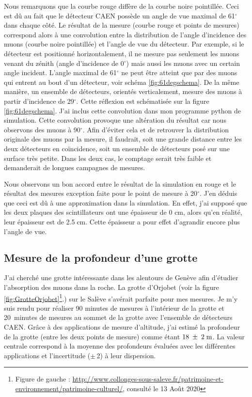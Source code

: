 \documentclass[a4paper, 12pt]{article}
\begin{document}
\begin{spacing}{1.5}
Nous remarquons que la courbe rouge diffère de la courbe noire pointillée. Ceci est dû au fait que le détecteur CAEN possède un angle de vue maximal de 61$^{\circ}$ dans chaque côté. Le résultat de la mesure (courbe rouge et points de mesures) correspond alors à une convolution entre la distribution de l'angle d'incidence des muons (courbe noire pointillée) et l'angle de vue du détecteur. Par exemple, si le détecteur est positionné horizontalement, il ne mesure pas seulement les muons venant du zénith (angle d'incidence de 0$^{\circ}$) mais aussi les muons avec un certain angle incident. L'angle maximal de 61$^{\circ}$ ne peut être atteint que par des muons qui entrent au bout d'un détecteur, voir schéma \ref{fig:61degschema}. De la même manière, un ensemble de détecteurs, orientés verticalement, mesure des muons à partir d'incidence de 29$^{\circ}$. Cette réflexion est schématisée sur la figure \ref{fig:61degschema}. J'ai inclus cette convolution dans mon programme python de simulation. Cette convolution provoque une altération du résultat car nous observons des muons à 90$^{\circ}$. Afin d'éviter cela et de retrouver la distribution originale des muons par la mesure, il faudrait, soit une grande distance entre les deux détecteurs en coïncidence, soit un ensemble de détecteurs posé sur une surface très petite. Dans les deux cas, le comptage serait très faible et demanderait de longues campagnes de mesures.

Nous observons un bon accord entre le résultat de la simulation en rouge et le résultat des mesures exception faite pour le point de mesure à 20$^{\circ}$. J'en déduis que ceci est dû à une approximation dans la simulation. En effet, j'ai supposé que les deux plaques des scintillateurs ont une épaisseur de 0 cm, alors qu'en réalité, leur épaisseur est de 2.5$\;$cm. Cette épaisseur a pour effet d'agrandir encore plus l'angle de vue.

\subsection{Mesure de la profondeur d'une grotte}

J'ai cherché une grotte intéressante dans les alentours de Genève afin d'étudier l'absorption des muons dans la roche. La grotte d'Orjobet (voir la figure \ref{fig:GrotteOrjobet}\footnote{Figure de gauche : \url{http://www.collonges-sous-saleve.fr/patrimoine-et-environnement/patrimoine-culturel/}, consulté le 13 Août 2020}.) sur le Salève s'avérait parfaite pour mes mesures. Je m'y suis rendu pour réaliser 90 minutes de mesures à l'intérieur de la grotte et 20~minutes de mesures au sommet de la grotte avec l'ensemble de détecteurs CAEN. Grâce à des applications de mesure d'altitude, j'ai estimé la profondeur de la grotte (entre les deux points de mesure) comme étant $18\;\pm\;2\;{\rm m}$. La valeur centrale correspond à la moyenne des profondeurs évaluées avec les différentes applications et l'incertitude ($\pm\,$2) à leur dispersion. 


\end{spacing}
\end{document}
